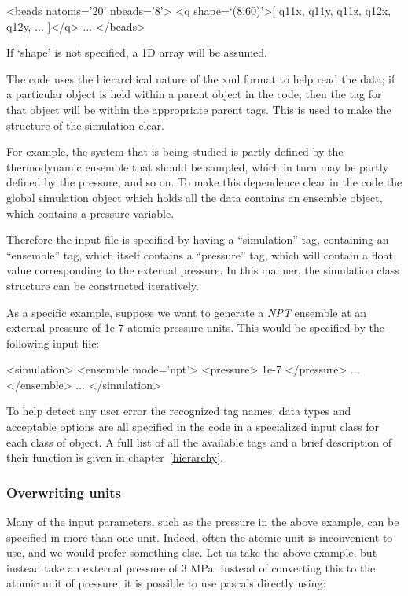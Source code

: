 \documentclass[11pt,english,fleqn]{report}
\newenvironment{code}{%
\footnotesize 
\verbatim
}{
\endverbatim
\normalsize
}
\begin{document}
\begin{code}
<beads natoms='20' nbeads='8'>
   <q shape=`(8,60)'>[ q11x, q11y, q11z, q12x, q12y, ... ]</q>
   ...
</beads>
\end{code}

If `shape' is not specified, a 1D array will be assumed.

The code uses the hierarchical nature of the xml format to help read the data; if
a particular object is held within a parent object in the code, then
the tag for that object will be within the appropriate parent tags.
This is used to make the structure of the simulation clear. 

For example,
the system that is being studied is partly defined by the thermodynamic
ensemble that should be sampled, which in turn may be partly defined
by the pressure, and so on. To make this dependence clear in the code
the global simulation object which holds all the data contains
an ensemble object, which contains a pressure variable.
 
Therefore the input file is specified
by having a {}``simulation'' tag, containing an {}``ensemble''
tag, which itself contains a {}``pressure'' tag, which will contain
a float value corresponding to the external pressure. In this
manner, the simulation class structure can be constructed iteratively.

As a specific example, suppose we want to generate a \emph{NPT} ensemble at an external
pressure of 1e-7 atomic pressure units. This would be specified by
the following input file: 

\begin{code}
<simulation>
   <ensemble mode='npt'>
      <pressure> 1e-7 </pressure>
      ...
   </ensemble>
   ...
</simulation>
\end{code}

To help detect any user error the recognized tag names, data types
and acceptable options are all specified in the code in a specialized
input class for each class of object. A full list of all the available
tags and a brief description of their function is given in chapter~\ref{hierarchy}.


\subsubsection{Overwriting units}

\label{inputunits}

Many of the input parameters, such as the pressure in the above example,
can be specified in more than one unit. Indeed, often the atomic unit
is inconvenient to use, and we would prefer something else. Let us
take the above example, but instead take an external pressure of 3
MPa. Instead of converting this to the atomic unit of pressure, it
is possible to use pascals directly using:
\end{document}
